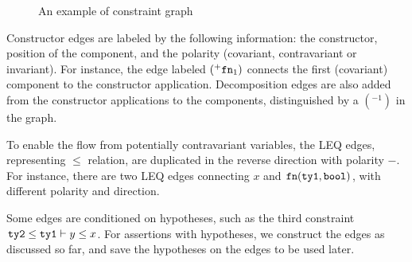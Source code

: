 \begin{figure}
\begin{center}
%
%
\end{center}
\caption{An example of constraint graph}
\label{fig:consgraph}
\end{figure}

Constructor edges are labeled by the following information: the constructor,
position of the component, and the polarity (covariant, contravariant or
invariant). For instance, the edge labeled $(^{+}\mathtt{fn}_1)$
connects the first (covariant) component to the constructor
application.
%
Decomposition edges are also added from the constructor applications
to the components, distinguished by a $(^{-1})$ in the graph.

To enable the flow from potentially contravariant variables, the LEQ edges,
representing $\leq$ relation, are duplicated in the reverse direction with
polarity $-$. For instance, there are two LEQ edges connecting $x$ and
$\mathtt{fn}(\mathtt{ty1},\mathtt{bool})$, with different polarity and direction.

Some edges are conditioned on hypotheses, such as the third constraint
$\mathtt{ty2} \leq \mathtt{ty1} \vdash y \leq x$. For assertions with
hypotheses, we construct the edges as discussed so far, and save the
hypotheses on the edges to be used later.

